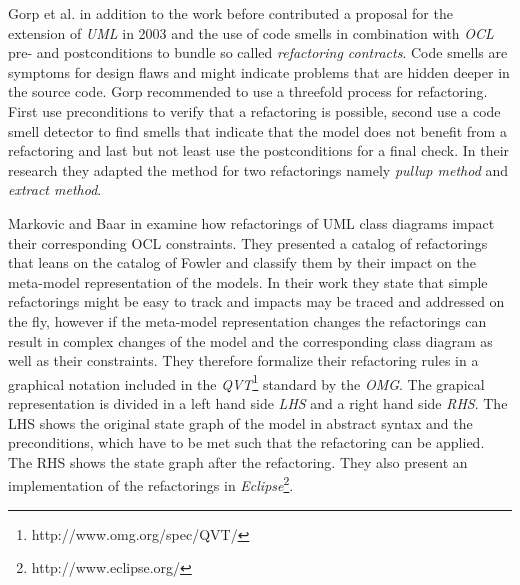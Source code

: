 \documentclass{llncs}
\begin{document}
Gorp et al. \cite{gorp03} in addition to the work before contributed a proposal for the extension of \textit{UML} in 2003 and the use of code smells in combination with \textit{OCL} pre- and postconditions to bundle so called \textit{refactoring contracts}. Code smells are symptoms for design flaws and might indicate problems that are hidden deeper in the source code. Gorp recommended to use a threefold process for refactoring. First use preconditions to verify that a refactoring is possible, second use a code smell detector to find smells that indicate that the model does not benefit from a refactoring and last but not least use the postconditions for a final check. In their research they adapted the method for two refactorings namely \textit{pullup method} and \textit{extract method}.

Markovic and Baar in \cite{DBLP:journals/sosym/MarkovicB08} examine how refactorings of UML class diagrams impact their corresponding OCL constraints. They presented a catalog of refactorings that leans on the catalog of Fowler and classify them by their impact on the meta-model representation of the models. In their work they state that simple refactorings might be easy to track and impacts may be traced and addressed on the fly, however if the meta-model representation changes the refactorings can result in complex changes of the model and the corresponding class diagram as well as their constraints. They therefore formalize their refactoring rules in a graphical notation included in the \textit{QVT}\footnote{http://www.omg.org/spec/QVT/} standard by the \textit{OMG}. The grapical representation is divided in a left hand side \textit{LHS} and a right hand side \textit{RHS}. The LHS shows the original state graph of the model in abstract syntax and the preconditions, which have to be met such that the refactoring can be applied. The RHS shows the state graph after the refactoring. They also present an implementation of the refactorings in \textit{Eclipse}\footnote{http://www.eclipse.org/}.
\end{document}

